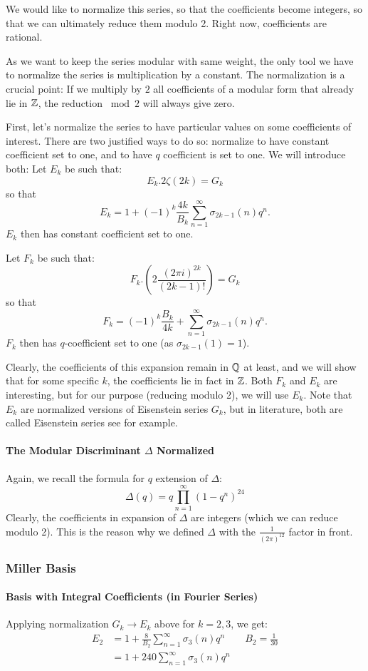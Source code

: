 We would like to normalize this series, so that the coefficients become integers, so that we can ultimately reduce them modulo 2.
Right now, coefficients are rational.

As we want to keep the series modular with same weight, the only tool we have to normalize the series is multiplication by a constant.
The normalization is a crucial point: 
If we multiply by $2$ all coefficients of a modular form that already lie in $\mathbb{Z}$, the reduction $\bmod 2$ will always give zero.

First, let's normalize the series to have particular values on some coefficients of interest.
There are two justified ways to do so: normalize to have constant coefficient set to one, and to have $q$ coefficient is set to one.
We will introduce both:
Let $E_k$ be such that:
$$
E_k.2\zeta(2k) = G_k
$$
so that
$$
E_k = 1 + (-1)^k \frac{4k}{B_k} \sum_{n=1}^{\infty} \sigma_{2k-1}(n)q^n.
$$
$E_k$ then has constant coefficient set to one.

Let $F_k$ be such that:
$$
F_k.\left( 2 \frac{{(2 \pi i)}^{2k}}{(2k-1)!} \right) = G_k
$$
so that
$$
F_k =  (-1)^k \frac{B_k}{4k} + \sum_{n=1}^{\infty} \sigma_{2k-1}(n)q^n.
$$
$F_k$ then has $q$-coefficient set to one (as $\sigma_{2k-1}(1)=1$).

Clearly, the coefficients of this expansion remain in $\mathbb{Q}$ at least, and we will show that for some specific $k$, the coefficients lie in fact in $\mathbb{Z}$.
Both $F_k$ and $E_k$ are interesting, but for our purpose (reducing modulo 2), we will use $E_k$.
Note that $E_k$ are normalized versions of Eisenstein series $G_k$, but in literature, both are called Eisenstein series see \cite[p.6]{IntoductionModularFormsWorkshop} for example.

\paragraph{The Modular Discriminant $\Delta$ Normalized}
Again, we recall the formula for $q$ extension of $\Delta$:
$$
\Delta(q) = q \prod_{n=1}^{\infty} (1-q^n)^{24}
$$
Clearly, the coefficients in expansion of $\Delta$ are integers (which we can reduce modulo 2).
This is the reason why we defined $\Delta$ with the $\frac{1}{(2\pi)^{12}}$ factor in front.


\subsubsection{Miller Basis}
\paragraph{Basis with Integral Coefficients (in Fourier Series)}
Applying normalization $G_k \to E_k$ above for $k=2,3$, we get:
\begin{align*}
	E_2 &= 1 + \frac{8}{B_2} \sum_{n=1}^{\infty} \sigma_{3}(n)q^n \qquad B_2 = \frac{1}{30} \\
	    &= 1 + 240 \sum_{n=1}^{\infty} \sigma_{3}(n)q^n
\end{align*}

